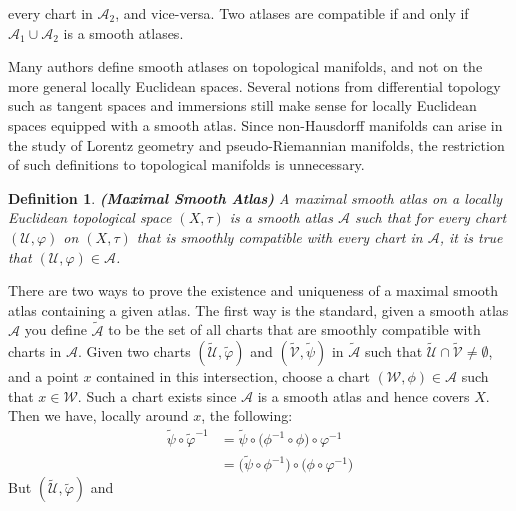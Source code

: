 \documentclass{article}
\theoremstyle{plain}
\theoremstyle{normal}
\newtheorem{definition}{Definition}[section]
\begin{document}
        every chart in $\mathcal{A}_{2}$, and vice-versa. Two atlases are
        compatible if and only if $\mathcal{A}_{1}\cup\mathcal{A}_{2}$ is a
        smooth atlases.
        \par\hfill\par
        Many authors define smooth atlases on topological manifolds, and not
        on the more general locally Euclidean spaces. Several notions from
        differential topology such as tangent spaces and immersions still make
        sense for locally Euclidean spaces equipped with a smooth atlas. Since
        non-Hausdorff manifolds can arise in the study of Lorentz geometry and
        pseudo-Riemannian manifolds, the restriction of such definitions to
        topological manifolds is unnecessary.
        \begin{definition}{\textbf{(Maximal Smooth Atlas)}}
            A maximal smooth atlas on a locally Euclidean topological space
            $(X,\tau)$ is a smooth atlas $\mathcal{A}$ such that for every
            chart $(\mathcal{U},\varphi)$ on $(X,\tau)$ that is smoothly
            compatible with every chart in $\mathcal{A}$, it is true that
            $(\mathcal{U},\varphi)\in\mathcal{A}$.
        \end{definition}
        There are two ways to prove the existence and uniqueness of a maximal
        smooth atlas containing a given atlas. The first way is the standard,
        given a smooth atlas $\mathcal{A}$ you define $\tilde{\mathcal{A}}$ to
        be the set of all charts that are smoothly compatible with charts in
        $\mathcal{A}$. Given two charts $(\tilde{\mathcal{U}},\tilde{\varphi})$
        and $(\tilde{\mathcal{V}},\tilde{\psi})$ in $\tilde{\mathcal{A}}$ such
        that $\tilde{\mathcal{U}}\cap\tilde{\mathcal{V}}\ne\emptyset$, and a
        point $x$ contained in this intersection, choose a
        chart $(\mathcal{W},\phi)\in\mathcal{A}$ such that $x\in\mathcal{W}$.
        Such a chart exists since $\mathcal{A}$ is a smooth atlas and hence
        covers $X$. Then we have, locally around $x$, the following:
        \begin{align}
            \tilde{\psi}\circ\tilde{\varphi}^{-1}
                &=\tilde{\psi}\circ\big(
                    \phi^{-1}\circ\phi
                \big)\circ\varphi^{-1}\\
                &=\big(\tilde{\psi}\circ\phi^{-1}\big)\circ
                    \big(\phi\circ\varphi^{-1}\big)
        \end{align}
        But $(\tilde{\mathcal{U}},\tilde{\varphi})$ and
\end{document}
